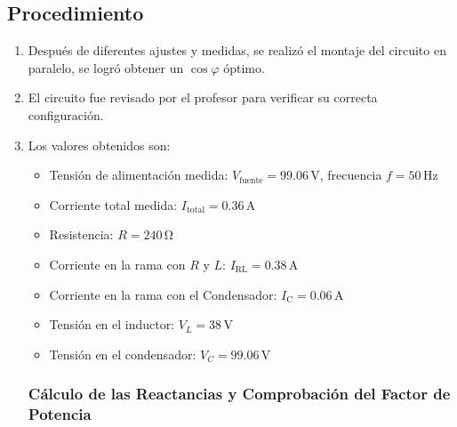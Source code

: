 \documentclass{article}
\begin{document}
\subsection{Procedimiento}
\begin{enumerate}
  \item Después de diferentes ajustes y medidas, se realizó el montaje del circuito en paralelo, se logró obtener un $\cos \varphi$ óptimo.
  \item El circuito fue revisado por el profesor para verificar su correcta configuración.
  \item Los valores obtenidos son:
  \begin{itemize}
    \item Tensión de alimentación medida: $V_{\text{fuente}} = 99.06\,\si{\volt}$, frecuencia $f = 50\,\si{\hertz}$
    \item Corriente total medida: $I_{\text{total}} = 0.36 \,\si{\ampere}$
    \item Resistencia: $R = 240\,\si{\ohm}$
    \item Corriente en la rama con $R$ y $L$: $I_{\text{RL}} = 0.38\,\si{\ampere}$
    \item Corriente en la rama con el Condensador: $I_{\text{C}} = 0.06\,\si{\ampere}$
    \item Tensión en el inductor: $V_L = 38 \,\si{\volt}$
    \item Tensión en el condensador: $V_C = 99.06\,\si{\volt}$
  \end{itemize}
  \subsubsection{Cálculo de las Reactancias y Comprobación del Factor de Potencia}
\end{enumerate}
\end{document}
